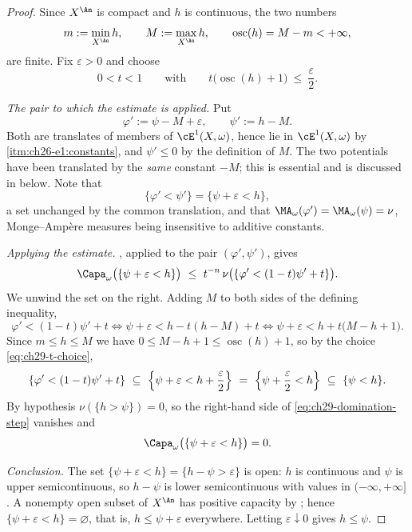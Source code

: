 \begin{proof}
Since $X^{\An}$ is compact and $h$ is continuous, the two numbers
\begin{equation}
\label{eq:ch29-h-bounds}
 m:=\min_{X^{\An}}h,\qquad M:=\max_{X^{\An}}h,
 \qquad \operatorname{osc}(h)=M-m<+\infty,
\end{equation}
are finite.  Fix $\varepsilon>0$ and choose
\begin{equation}
\label{eq:ch29-t-choice}
 0<t<1
 \qquad\text{with}\qquad
 t\bigl(\operatorname{osc}(h)+1\bigr)\ \leq\ \frac\varepsilon2 .
\end{equation}

\emph{The pair to which the estimate is applied.}  Put
\[
 \varphi':=\psi-M+\varepsilon,
 \qquad
 \psi':=h-M .
\]
Both are translates of members of $\cE^1(X,\omega)$, hence lie in
$\cE^1(X,\omega)$ by
\,\cref{itm:ch26-e1:constants}, and
$\psi'\leq0$ by the definition of $M$.  The two potentials have been
translated by the \emph{same} constant $-M$; this is essential and is
discussed in  below.  Note that
\[
 \{\varphi'<\psi'\}=\{\psi+\varepsilon<h\},
\]
a set unchanged by the common translation, and that
$\MA_\omega(\varphi')=\MA_\omega(\psi)=\nu$, Monge--Amp\`ere measures
being insensitive to additive constants.

\emph{Applying the estimate.}  , applied to
the pair $(\varphi',\psi')$, gives
\begin{equation}
\label{eq:ch29-domination-step}
 \Capa_\omega\bigl(\{\psi+\varepsilon<h\}\bigr)
 \ \leq\ t^{-n}\,
   \nu\bigl(\{\varphi'<(1-t)\psi'+t\}\bigr).
\end{equation}
We unwind the set on the right.  Adding $M$ to both sides of the defining
inequality,
\[
 \varphi'<(1-t)\psi'+t
 \iff
 \psi+\varepsilon<h-t(h-M)+t
 \iff
 \psi+\varepsilon<h+t\bigl(M-h+1\bigr).
\]
Since $m\leq h\leq M$ we have $0\leq M-h+1\leq\operatorname{osc}(h)+1$,
so by the choice \eqref{eq:ch29-t-choice},
\[
 \{\varphi'<(1-t)\psi'+t\}
 \ \subseteq\ \Bigl\{\psi+\varepsilon<h+\frac\varepsilon2\Bigr\}
 \ =\ \Bigl\{\psi+\frac\varepsilon2<h\Bigr\}
 \ \subseteq\ \{\psi<h\}.
\]
By hypothesis $\nu(\{h>\psi\})=0$, so the right-hand side of
\eqref{eq:ch29-domination-step} vanishes and
\[
 \Capa_\omega\bigl(\{\psi+\varepsilon<h\}\bigr)=0 .
\]

\emph{Conclusion.}  The set $\{\psi+\varepsilon<h\}=\{h-\psi>\varepsilon\}$
is open: $h$ is continuous and $\psi$ is upper semicontinuous, so
$h-\psi$ is lower semicontinuous with values in
$(-\infty,+\infty]$.  A nonempty open subset of $X^{\An}$ has positive
capacity by ; hence
$\{\psi+\varepsilon<h\}=\varnothing$, that is,
$h\leq\psi+\varepsilon$ everywhere.  Letting
$\varepsilon\downarrow0$ gives $h\leq\psi$.
\end{proof}

